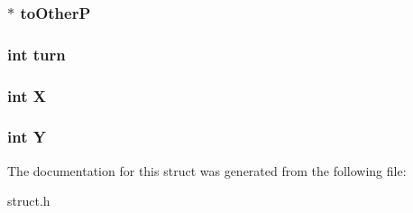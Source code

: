 \subsubsection[{\texorpdfstring{to\+OtherP}{toOtherP}}]{$\ast$ to\+OtherP}\hypertarget{struct___player_acb6bf1fa3b8884d0c9ce0b566a534bcc}{}\label{struct___player_acb6bf1fa3b8884d0c9ce0b566a534bcc}
\subsubsection[{\texorpdfstring{turn}{turn}}]{\setlength{\rightskip}{0pt plus 5cm}int turn}\hypertarget{struct___player_aaefa47f4fdf865c2358c22b542a993e4}{}\label{struct___player_aaefa47f4fdf865c2358c22b542a993e4}
\subsubsection[{\texorpdfstring{X}{X}}]{\setlength{\rightskip}{0pt plus 5cm}int X}\hypertarget{struct___player_a80c0944640e62d3ed6c5419c1bcc0c88}{}\label{struct___player_a80c0944640e62d3ed6c5419c1bcc0c88}
\subsubsection[{\texorpdfstring{Y}{Y}}]{\setlength{\rightskip}{0pt plus 5cm}int Y}\hypertarget{struct___player_aa482c4cc86a24474e4fb19b5b5978778}{}\label{struct___player_aa482c4cc86a24474e4fb19b5b5978778}


The documentation for this struct was generated from the following file\+:\begin{DoxyCompactItemize}
\item 
struct.\+h\end{DoxyCompactItemize}

